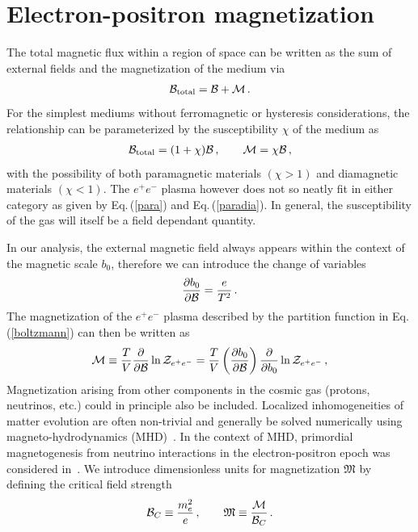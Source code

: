 \documentclass[reprint]{revtex4-2}
\newcommand{\req}[1]{Eq.\,(\ref{#1})}
\begin{document}
\section{Electron-positron magnetization}
\label{sec:magnetization}
\noindent The total magnetic flux within a region of space can be written as the sum of external fields and the magnetization of the medium via
\begin{align}
    \label{totalmag}
    {\cal B}_{\rm total} = {\cal B} + {\cal M}\,.
\end{align}
For the simplest mediums without ferromagnetic or hysteresis considerations, the relationship can be parameterized by the susceptibility $\chi$ of the medium as
\begin{align}
    \label{susceptibility}
    {\cal B}_{\rm total} = (1+\chi){\cal B}\,,\qquad {\cal M} = \chi{\cal B}\,,
\end{align}
with the possibility of both paramagnetic materials $(\chi>1)$ and diamagnetic materials $(\chi<1)$. The $e^{+}e^{-}$ plasma however does not so neatly fit in either category as given by \req{para} and \req{paradia}. In general, the susceptibility of the gas will itself be a field dependant quantity.

In our analysis, the external magnetic field always appears within the context of the magnetic scale $b_{0}$, therefore we can introduce the change of variables
\begin{align}
    \frac{\partial b_{0}}{\partial{\cal B}}=\frac{e}{T^{2}}\,.
\end{align}
The magnetization of the $e^{+}e^{-}$ plasma described by the partition function in \req{boltzmann} can then be written as
\begin{align}
    \label{defmagetization}
    {\cal M}\equiv\frac{T}{V}\frac{\partial}{\partial{\cal B}}\ln{{\cal Z}_{e^{+}e^{-}}} = \frac{T}{V}\left(\frac{\partial b_{0}}{\partial{\cal B}}\right)\frac{\partial}{\partial b_{0}}\ln{{\cal Z}_{e^{+}e^{-}}}\,,
\end{align}
Magnetization arising from other components in the cosmic gas (protons, neutrinos, etc.) could in principle also be included. Localized inhomogeneities of matter evolution are often non-trivial and generally be solved numerically using magneto-hydrodynamics (MHD)~\cite{melrose2008quantum,vazza2017simulations}. In the context of MHD, primordial magnetogenesis from neutrino interactions in the electron-positron epoch was considered in~\cite{perrone2021neutrinoelectron}. We introduce dimensionless units for magnetization ${\mathfrak M}$ by defining the critical field strength
\begin{align}
    {\cal B}_{C}\equiv\frac{m_{e}^{2}}{e}\,,\qquad{\mathfrak M}\equiv\frac{\cal M}{{\cal B}_{C}}\,.
\end{align}
\end{document}
